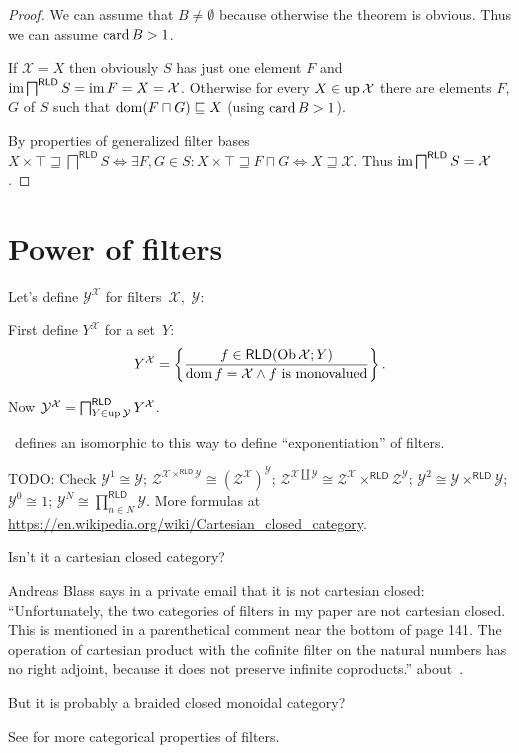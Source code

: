 \begin{proof}
  We can assume that $B \neq \emptyset$ because otherwise the theorem is
  obvious. Thus we can assume $\operatorname{card} B>1$.

  If $\mathcal{X} = X$ then obviously $S$ has just one element $F$ and
  $\operatorname{im} \bigsqcap^{\mathsf{RLD}} S = \operatorname{im} F = X =
  \mathcal{X}$. Otherwise for every $X \in \operatorname{up} \mathcal{X}$ there are
  elements $F$, $G$ of $S$ such that $\operatorname{dom} (F \sqcap G) \sqsubseteq X$
  (using $\operatorname{card} B > 1$).
  
  By properties of generalized filter bases $X \times \top \sqsupseteq
  \bigsqcap^{\mathsf{RLD}} S \Leftrightarrow \exists F, G \in S : X
  \times \top \sqsupseteq F \sqcap G \Leftrightarrow X \sqsupseteq
  \mathcal{X}$. Thus $\operatorname{im} \bigsqcap^{\mathsf{RLD}} S =
  \mathcal{X}$.
\end{proof}

\section{Power of filters}

Let's define $\mathcal{Y}^{\mathcal{X}}$ for filters~$\mathcal{X}$,~$\mathcal{Y}$:

First define $Y^{\mathcal{X}}$ for a set~$Y$:
\[ Y^{\mathcal{X}} = \left\{ \frac{ f \in \mathsf{RLD} (\operatorname{Ob} \mathcal{X}
   ; Y) }{ \operatorname{dom} f = \mathcal{X} \wedge f\text{ is monovalued} }\right\} . \]

Now $\mathcal{Y}^{\mathcal{X}} = \bigsqcap^{\mathsf{RLD}}_{Y \in
\operatorname{up} \mathcal{Y}} Y^{\mathcal{X}}$.

\cite{filt-cats}~defines an isomorphic to this way to define ``exponentiation'' of filters.

TODO: Check $\mathcal{Y}^1 \cong \mathcal{Y}$; $\mathcal{Z}^{\mathcal{X}
\times^{\mathsf{RLD}} \mathcal{Y}} \cong
(\mathcal{Z}^{\mathcal{X}})^{\mathcal{Y}}$; $\mathcal{Z}^{\mathcal{X} \amalg
\mathcal{Y}} \cong \mathcal{Z}^{\mathcal{X}} \times^{\mathsf{RLD}}
\mathcal{Z}^{\mathcal{Y}}$; $\mathcal{Y}^2 \cong \mathcal{Y}\times^{\mathsf{RLD}}\mathcal{Y}$;
$\mathcal{Y}^0 \cong 1$; $\mathcal{Y}^N \cong \prod^{\mathsf{RLD}}_{n\in N}\mathcal{Y}$.
More formulas at \url{https://en.wikipedia.org/wiki/Cartesian_closed_category}.

Isn't it a cartesian closed category?

Andreas Blass says in a private email that it is not cartesian closed: ``Unfortunately, the two categories of filters in my paper are
not cartesian closed.  This is mentioned in a parenthetical comment
near the bottom of page 141.  The operation of cartesian product with
the cofinite filter on the natural numbers has no right adjoint,
because it does not preserve infinite coproducts.''
about~\cite{filt-cats}.

But it is probably a braided closed monoidal category?

See \cite{filt-cats} for more categorical properties of filters.
